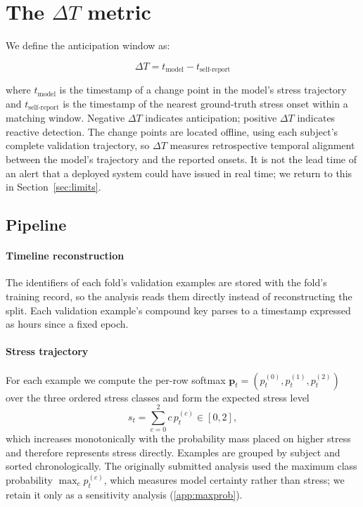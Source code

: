 \documentclass[preprint,12pt,authoryear]{elsarticle}
\newcommand{\dt}{$\Delta T$}
\begin{document}
\section{The \dt{} metric}
\label{sec:dt}

We define the anticipation window as:

\begin{equation}
\Delta T = t_{\mathrm{model}} - t_{\mathrm{self\text{-}report}}
\label{eq:dt}
\end{equation}

where $t_{\mathrm{model}}$ is the timestamp of a change point in the
model's stress trajectory and $t_{\mathrm{self\text{-}report}}$ is
the timestamp of the nearest ground-truth stress onset within a matching
window. Negative \dt{} indicates anticipation; positive \dt{} indicates
reactive detection. The change points are located offline, using each
subject's complete validation trajectory, so \dt{} measures
retrospective temporal alignment between the model's trajectory and the
reported onsets. It is not the lead time of an alert that a deployed
system could have issued in real time; we return to this in
Section~\ref{sec:limits}.

\subsection{Pipeline}

\paragraph{Timeline reconstruction} The identifiers of each fold's
validation examples are stored with the fold's training record, so the
analysis reads them directly instead of reconstructing the split. Each
validation
example's compound key parses to a timestamp expressed as hours since a
fixed epoch.

\paragraph{Stress trajectory} For each example we compute the
per-row softmax $\mathbf{p}_t = (p_t^{(0)}, p_t^{(1)}, p_t^{(2)})$ over
the three ordered stress classes and form the expected stress level
\begin{equation}
s_t = \sum_{c=0}^{2} c \, p_t^{(c)} \in [0, 2],
\label{eq:stress}
\end{equation}
which increases monotonically with the probability mass placed on
higher stress and therefore represents stress directly. Examples are
grouped by subject and sorted chronologically. The originally submitted
analysis used the maximum class probability $\max_c p_t^{(c)}$, which
measures model certainty rather than stress; we retain it only as a
sensitivity analysis (\ref{app:maxprob}).
\end{document}
